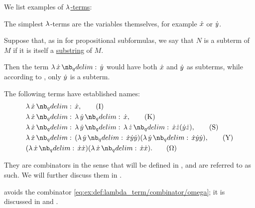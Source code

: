 \begin{example}\label{ex:def:lambda_term}
  We list examples of \hyperref[def:lambda_term]{\( \mathrm{\lambda} \)-terms}:
  \begin{thmenum}
     The simplest \( \mathrm{\lambda} \)-terms are the variables themselves, for example \( {\dot{x}} \) or \( {\dot{y}} \).

     Suppose that, as in  for propositional subformulas, we say that \( N \) is a subterm of \( M \) if it is itself a \hyperref[def:formal_language/substring]{substring} of \( M \).

    Then the term \( \qabs \synx \syny \) would have both \( {\dot{x}} \) and \( {\dot{y}} \) as subterms, while according to , only \( {\dot{y}} \) is a subterm.

     The following terms have established names:
    \begin{subequations}
      \begin{align}
        &\qabs \synx \synx, \label{eq:ex:def:lambda_term/combinator/i}\tag{I} \\
        &\qabs \synx \qabs \syny \synx, \label{eq:ex:def:lambda_term/combinator/k}\tag{K} \\
        &\qabs \synx \qabs \syny \qabs \synz \synx \synz (\syny \synz), \label{eq:ex:def:lambda_term/combinator/s}\tag{S} \\
        &\qabs \synx (\qabs \syny \synx \syny \syny) (\qabs \syny \synx \syny \syny), \label{eq:ex:def:lambda_term/combinator/y}\tag{Y} \\
        &(\qabs \synx \synx \synx) (\qabs \synx \synx \synx). \label{eq:ex:def:lambda_term/combinator/omega}\tag{\ensuremath{ \Omega }}
      \end{align}
    \end{subequations}

    They are combinators in the sense that will be defined in , and are referred to as such. We will further discuss them in .

     avoids the combinator \ref{eq:ex:def:lambda_term/combinator/omega}; it is discussed in  and .
  \end{thmenum}
\end{example}


